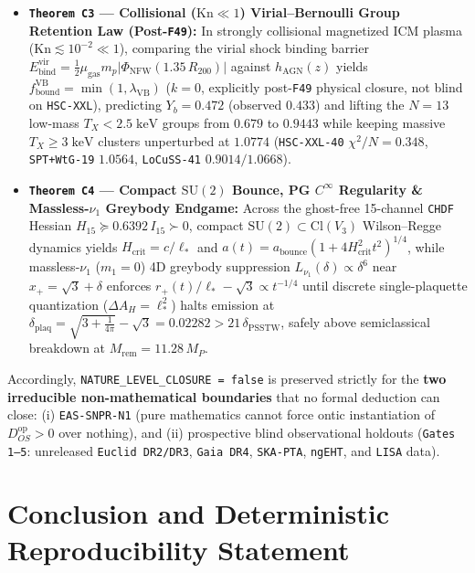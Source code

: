 \documentclass[11pt,a4paper]{article}
\theoremstyle{remark}
\begin{document}
\begin{itemize}
  \item \textbf{\texttt{Theorem C3} --- Collisional ($\mathrm{Kn} \ll 1$) Virial--Bernoulli Group Retention Law (Post-\texttt{F49}):} In strongly collisional magnetized ICM plasma ($\mathrm{Kn} \lesssim 10^{-2} \ll 1$), comparing the virial shock binding barrier $E_{\mathrm{bind}}^{\mathrm{vir}} = \frac{1}{2}\mu_{\mathrm{gas}}m_p|\Phi_{\mathrm{NFW}}(1.35\,R_{200})|$ against $h_{\mathrm{AGN}}(z)$ yields $f_{\mathrm{bound}}^{\mathrm{VB}} = \min(1, \lambda_{\mathrm{VB}})$ ($k = 0$, explicitly post-\texttt{F49} physical closure, not blind on \texttt{HSC-XXL}), predicting $Y_b = 0.472$ (observed $0.433$) and lifting the $N = 13$ low-mass $T_X < 2.5\;\mathrm{keV}$ groups from $0.679$ to \textbf{$0.9443$} while keeping massive $T_X \ge 3\;\mathrm{keV}$ clusters unperturbed at \textbf{$1.0774$} (\texttt{HSC-XXL-40} $\chi^2/N = 0.348$, \texttt{SPT+WtG-19} $1.0564$, \texttt{LoCuSS-41} $0.9014 / 1.0668$).
  \item \textbf{\texttt{Theorem C4} --- Compact $\mathrm{SU}(2)$ Bounce, PG $C^\infty$ Regularity \& Massless-$\nu_1$ Greybody Endgame:} Across the ghost-free 15-channel \texttt{CHDF} Hessian $H_{15} \succeq 0.6392\,I_{15} \succ 0$, compact $\mathrm{SU}(2) \subset \mathrm{Cl}(V_3)$ Wilson--Regge dynamics yields $H_{\mathrm{crit}} = c/\ell_*$ and $a(t) = a_{\mathrm{bounce}}(1 + 4H_{\mathrm{crit}}^2 t^2)^{1/4}$, while massless-$\nu_1$ ($m_1 = 0$) 4D greybody suppression $L_{\nu_1}(\delta) \propto \delta^6$ near $x_+ = \sqrt{3} + \delta$ enforces $r_+(t)/\ell_* - \sqrt{3} \propto t^{-1/4}$ until discrete single-plaquette quantization ($\Delta A_H = \ell_*^2$) halts emission at $\delta_{\mathrm{plaq}} = \sqrt{3 + \frac{1}{4\pi}} - \sqrt{3} = 0.02282 > 21\,\delta_{\mathrm{PSSTW}}$, safely above semiclassical breakdown at $M_{\mathrm{rem}} = 11.28\,M_P$.
\end{itemize}
Accordingly, \texttt{NATURE\_\allowbreak LEVEL\_\allowbreak CLOSURE = false} is preserved strictly for the \textbf{two irreducible non-mathematical boundaries} that no formal deduction can close: (i) \texttt{EAS-SNPR-N1} (pure mathematics cannot force ontic instantiation of $D_{OS}^{\mathrm{op}} > 0$ over nothing), and (ii) prospective blind observational holdouts (\texttt{Gates 1--5}: unreleased \texttt{Euclid DR2/DR3}, \texttt{Gaia DR4}, \texttt{SKA-PTA}, \texttt{ngEHT}, and \texttt{LISA} data).

\section{Conclusion and Deterministic Reproducibility Statement}
\label{sec:conclusion}
\end{document}
